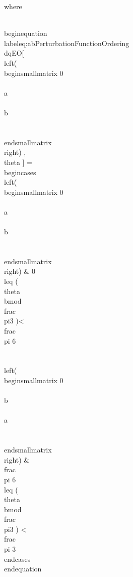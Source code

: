 where


\\begin{equation}\\label{eq:abPerturbationFunctionOrdering}
\\dqEO[  \\left(
\\begin{smallmatrix}
 0   \\\\
 a   \\\\
 b  \\\\
 \\end{smallmatrix} 
\\right)  ,\\theta ] =
\\begin{cases}
 \\left(
\\begin{smallmatrix}
 0 \\\\
 a  \\\\
 b \\\\
\\end{smallmatrix} 
\\right) & 0\\leq (\\theta  \\bmod \\frac{\\pi}{3} )<\\frac{\\pi }{6} \\\\
 \\left(
\\begin{smallmatrix}
 0 \\\\
 b  \\\\
 a \\\\
\\end{smallmatrix} 
\\right) & \\frac{\\pi }{6} \\leq (\\theta  \\bmod \\frac{\\pi}{3} ) < \\frac{\\pi }{3} 
\\end{cases}
\\end{equation}

